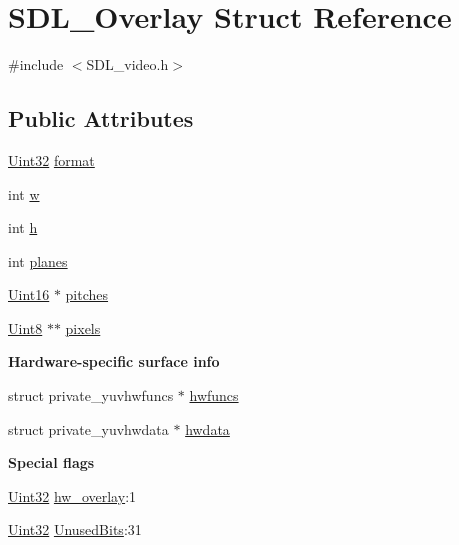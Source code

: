 \hypertarget{struct_s_d_l___overlay}{}\section{S\+D\+L\+\_\+\+Overlay Struct Reference}
\label{struct_s_d_l___overlay}


{\ttfamily \#include $<$S\+D\+L\+\_\+video.\+h$>$}

\subsection*{Public Attributes}
\begin{DoxyCompactItemize}
\item 
\hyperlink{_s_d_l__stdinc_8h_add440eff171ea5f55cb00c4a9ab8672d}{Uint32} \hyperlink{struct_s_d_l___overlay_a421f873d1ffc5530c1f9d4b49be75d4e}{format}
\item 
int \hyperlink{struct_s_d_l___overlay_a8a73fe76717c183d52dd67a6981fd84d}{w}
\item 
int \hyperlink{struct_s_d_l___overlay_af1402a7a7cd8ba2816ddc7542c9d3e67}{h}
\item 
int \hyperlink{struct_s_d_l___overlay_ab91d676ef6310197aa189c469be3d50a}{planes}
\item 
\hyperlink{_s_d_l__stdinc_8h_a31fcc0a076c9068668173ee26d33e42b}{Uint16} $\ast$ \hyperlink{struct_s_d_l___overlay_ad88bb773013ff535c647af38760c69e8}{pitches}
\item 
\hyperlink{_s_d_l__stdinc_8h_a2944638813a090aa23e62f4da842c3e2}{Uint8} $\ast$$\ast$ \hyperlink{struct_s_d_l___overlay_a782b8904e618e8a1c2c8299c3994ec8f}{pixels}
\end{DoxyCompactItemize}
\begin{Indent}{\bf Hardware-\/specific surface info}\par
\begin{DoxyCompactItemize}
\item 
struct private\+\_\+yuvhwfuncs $\ast$ \hyperlink{struct_s_d_l___overlay_aba6df163c475c57ba729bd9b86f87963}{hwfuncs}
\item 
struct private\+\_\+yuvhwdata $\ast$ \hyperlink{struct_s_d_l___overlay_acc40482a067d5c106747dab61bcee3c4}{hwdata}
\end{DoxyCompactItemize}
\end{Indent}
\begin{Indent}{\bf Special flags}\par
\begin{DoxyCompactItemize}
\item 
\hyperlink{_s_d_l__stdinc_8h_add440eff171ea5f55cb00c4a9ab8672d}{Uint32} \hyperlink{struct_s_d_l___overlay_a3c24f3b1805074deb9ce6ef5b14f70dc}{hw\+\_\+overlay}\+:1
\item 
\hyperlink{_s_d_l__stdinc_8h_add440eff171ea5f55cb00c4a9ab8672d}{Uint32} \hyperlink{struct_s_d_l___overlay_a3dff6185e5d7cba5455b17cbf96d23ed}{Unused\+Bits}\+:31
\end{DoxyCompactItemize}
\end{Indent}


